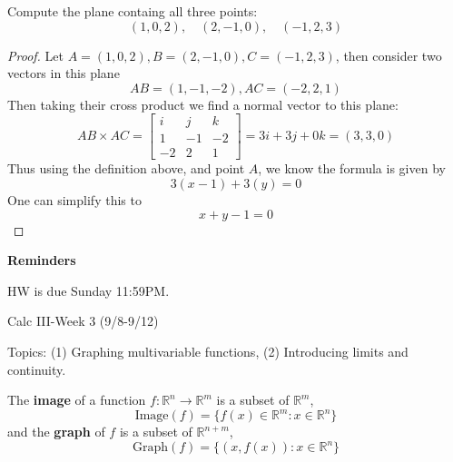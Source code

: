 \documentclass[openany]{book}
\newcommand{\R}{\mathbb{R}}
\begin{document}
\begin{prob}
    Compute the plane containg all three points:
    \begin{equation*}
        (1,0,2), \quad (2, -1, 0), \quad (-1, 2, 3)
    \end{equation*}
\end{prob}
\begin{proof}
    Let $A=(1,0,2), B=(2, -1, 0), C=(-1, 2, 3)$, then consider two vectors in this plane 
    \begin{equation*}
        AB=(1,-1,-2), AC=(-2,2,1)
    \end{equation*}
    Then taking their cross product we find a normal vector to this plane:
    \begin{equation*}
        AB\times AC=\begin{bmatrix}
            i&j&k\\
            1&-1&-2\\
            -2&2&1
        \end{bmatrix}=3i+3j+0k=(3,3,0)
    \end{equation*}
    Thus using the definition above, and point $A$, we know the formula is given by 
    \begin{equation*}
        3(x-1)+3(y)=0
    \end{equation*}
    One can simplify this to 
    \begin{equation*}
        x+y-1=0
    \end{equation*}
\end{proof}


\textbf{Reminders}

HW is due Sunday 11:59PM.



\newpage



\begin{center}
    \Large Calc III-Week 3 (9/8-9/12)
\end{center}

\renewcommand\thesection{\arabic{section}}

\noindent
Topics: (1) Graphing multivariable functions, (2) Introducing limits and continuity.

\begin{defn}[graph]
    The \textbf{image} of a function $f: \R^n\to\R^m$ is a subset of $\R^m$,
    \begin{equation*}
        \text{Image}(f)=\{f(x)\in\R^m: x\in\R^n\}
    \end{equation*}
    and the \textbf{graph} of $f$ is a subset of $\R^{n+m}$,
    \begin{equation*}
        \text{Graph}(f)=\{(x,f(x)): x\in\R^n\}
    \end{equation*}
\end{defn}
\end{document}

